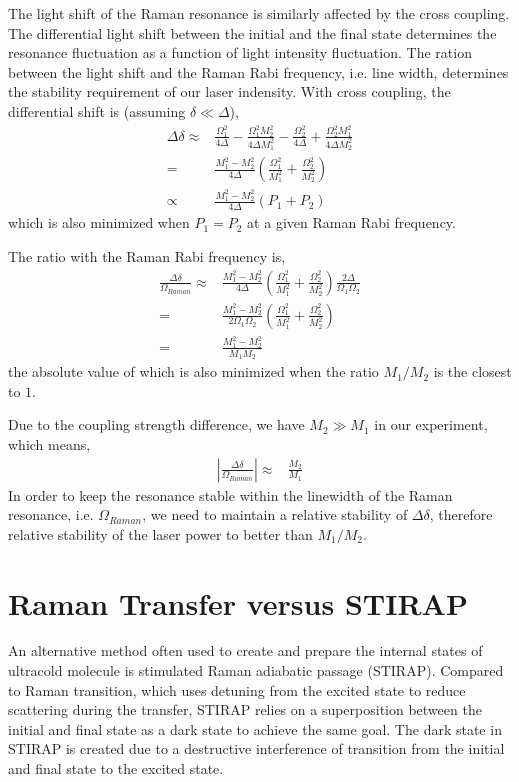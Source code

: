 The light shift of the Raman resonance is similarly affected by the cross coupling.
The differential light shift between the initial and the final state determines
the resonance fluctuation as a function of light intensity fluctuation.
The ration between the light shift and the Raman Rabi frequency, i.e. line width,
determines the stability requirement of our laser indensity.
With cross coupling, the differential shift is (assuming $\delta\ll\Delta$),
\begin{align*}
  \Delta\delta\approx&\frac{\Omega_1^2}{4\Delta}-\frac{\Omega_1^2M_2^2}{4\Delta M_1^2}-\frac{\Omega_2^2}{4\Delta}+\frac{\Omega_2^2M_1^2}{4\Delta M_2^2}\\
  =&\frac{M_1^2-M_2^2}{4\Delta}\left(\frac{\Omega_1^2}{M_1^2}+\frac{\Omega_2^2}{M_2^2}\right)\\
  \propto&\frac{M_1^2-M_2^2}{4\Delta}\left(P_1+P_2\right)
\end{align*}
which is also minimized when $P_1=P_2$ at a given Raman Rabi frequency.

The ratio with the Raman Rabi frequency is,
\begin{align*}
  \frac{\Delta\delta}{\Omega_{Raman}}\approx&\frac{M_1^2-M_2^2}{4\Delta}\left(\frac{\Omega_1^2}{M_1^2}+\frac{\Omega_2^2}{M_2^2}\right)\frac{2\Delta}{\Omega_1\Omega_2}\\
  =&\frac{M_1^2-M_2^2}{2\Omega_1\Omega_2}\left(\frac{\Omega_1^2}{M_1^2}+\frac{\Omega_2^2}{M_2^2}\right)\\
  =&\frac{M_1^2-M_2^2}{M_1M_2}
\end{align*}
the absolute value of which is also minimized when the ratio $M_1/M_2$ is the closest to $1$.

Due to the coupling strength difference, we have $M_2\gg M_1$ in our experiment, which means,
\begin{align*}
  \left|\frac{\Delta\delta}{\Omega_{Raman}}\right|\approx&\frac{M_2}{M_1}
\end{align*}
In order to keep the resonance stable within the linewidth of the Raman resonance,
i.e. $\Omega_{Raman}$, we need to maintain a relative stability of $\Delta\delta$,
therefore relative stability of the laser power to better than $M_1/M_2$.

\section{Raman Transfer versus STIRAP}

An alternative method often used to create and prepare the internal states of ultracold molecule
is stimulated Raman adiabatic passage (STIRAP)\todo{\cite{}}.
Compared to Raman transition, which uses detuning from the excited state
to reduce scattering during the transfer, STIRAP relies on a superposition between
the initial and final state as a dark state to achieve the same goal.
The dark state in STIRAP is created due to a destructive interference of transition
from the initial and final state to the excited state.

